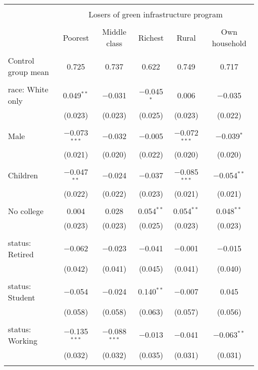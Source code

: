 
\begin{tabular}{@{\extracolsep{5pt}}lccccc} 
\\[-1.8ex]\hline 
\hline \\[-1.8ex] 
 & \multicolumn{5}{c}{Losers of green infrastructure program} \\ 
\cline{2-6} 
\\[-1.8ex] & Poorest & Middle class & Richest & Rural & Own household \\ 
\hline \\[-1.8ex] 
 Control group mean & 0.725 & 0.737 & 0.622 & 0.749 & 0.717  \\ \hline \\[-1.8ex] race: White only & 0.049$^{**}$ & $-$0.031 & $-$0.045$^{*}$ & 0.006 & $-$0.035 \\ 
  & (0.023) & (0.023) & (0.025) & (0.023) & (0.022) \\ 
  & & & & & \\ 
 Male & $-$0.073$^{***}$ & $-$0.032 & $-$0.005 & $-$0.072$^{***}$ & $-$0.039$^{*}$ \\ 
  & (0.021) & (0.020) & (0.022) & (0.020) & (0.020) \\ 
  & & & & & \\ 
 Children & $-$0.047$^{**}$ & $-$0.024 & $-$0.037 & $-$0.085$^{***}$ & $-$0.054$^{**}$ \\ 
  & (0.022) & (0.022) & (0.023) & (0.021) & (0.021) \\ 
  & & & & & \\ 
 No college & 0.004 & 0.028 & 0.054$^{**}$ & 0.054$^{**}$ & 0.048$^{**}$ \\ 
  & (0.023) & (0.023) & (0.025) & (0.023) & (0.023) \\ 
  & & & & & \\ 
 status: Retired & $-$0.062 & $-$0.023 & $-$0.041 & $-$0.001 & $-$0.015 \\ 
  & (0.042) & (0.041) & (0.045) & (0.041) & (0.040) \\ 
  & & & & & \\ 
 status: Student & $-$0.054 & $-$0.024 & 0.140$^{**}$ & $-$0.007 & 0.045 \\ 
  & (0.058) & (0.058) & (0.063) & (0.057) & (0.056) \\ 
  & & & & & \\ 
 status: Working & $-$0.135$^{***}$ & $-$0.088$^{***}$ & $-$0.013 & $-$0.041 & $-$0.063$^{**}$ \\ 
  & (0.032) & (0.032) & (0.035) & (0.031) & (0.031) \\ 
  & & & & & \\ 

\end{tabular}
